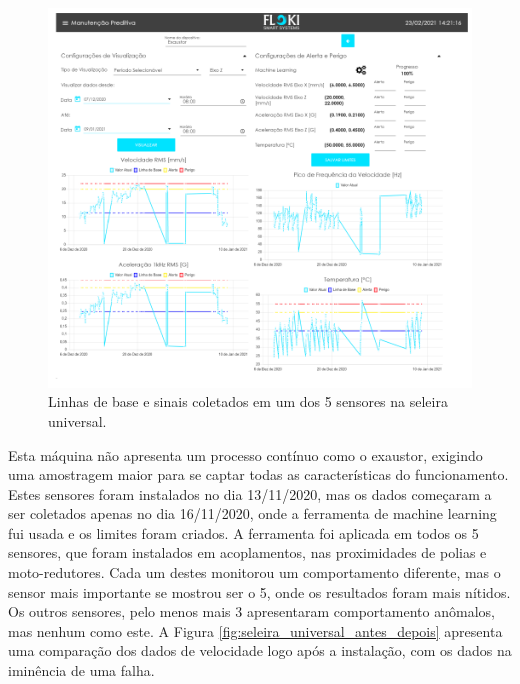 \begin{figure}[H]
    \caption{Linhas de base e sinais coletados em um dos 5 sensores na seleira universal.}
    \begin{center}
        \includegraphics[scale=0.9, page=4]{resultados/img/resultados.pdf}
    \end{center}
    \label{fig:seleira_universal}
\end{figure}

Esta máquina não apresenta um processo contínuo como o exaustor, exigindo uma amostragem maior para se captar todas as características do 
funcionamento. Estes sensores foram instalados no dia 13/11/2020, mas os dados começaram a ser coletados apenas no dia 16/11/2020, onde a 
ferramenta de machine learning fui usada e os limites foram criados. 
A ferramenta foi aplicada em todos os 5 sensores, que foram instalados em acoplamentos, nas proximidades de polias e moto-redutores.
Cada um destes monitorou um comportamento diferente, mas o sensor mais importante se mostrou ser o 5, onde os resultados foram mais nítidos. 
Os outros sensores, pelo menos mais 3 apresentaram comportamento anômalos, mas nenhum como este. A Figura \ref{fig:seleira_universal_antes_depois}
apresenta uma comparação dos dados de velocidade logo após a instalação, com os dados na iminência de uma falha.

